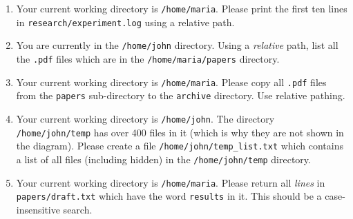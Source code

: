 \documentclass[11pt]{article}
\begin{document}
\begin{enumerate}

\item Your current working directory is \texttt{/home/maria}. Please print the first ten lines in \texttt{research/experiment.log} using a relative path.
\vspace{1.25cm}

\item You are currently in the \texttt{/home/john} directory. Using a \emph{relative} path, list all the \texttt{.pdf} files which are in the \texttt{/home/maria/papers} directory.
\vspace{1.25cm}

\item Your current working directory is \texttt{/home/maria}. Please copy all \texttt{.pdf} files from the \texttt{papers} sub-directory to the \texttt{archive} directory. Use relative pathing.
\vspace{1.25cm}

\item Your current working directory is \texttt{/home/john}. The directory \texttt{/home/john/temp} has over 400 files in it (which is why they are not shown in the diagram). Please create a file \texttt{/home/john/temp\_list.txt} which contains a list of all files (including hidden) in the \texttt{/home/john/temp} directory.
\vspace{1.25cm}

\item Your current working directory is \texttt{/home/maria}. Please return all \emph{lines} in \texttt{papers/draft.txt} which have the word \texttt{results} in it. This should be a case-insensitive search.

\end{enumerate}
\end{document}
